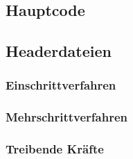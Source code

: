 \documentclass[
    oneside,
    ngerman,
    footinclude=false,
    captions=tableheading,
    DIV=12
]{scrartcl}
\begin{document}
    \aufgabe{}
        \subaufgabe{}
            
        \subaufgabe{}
            
        \subaufgabe{}

        \subaufgabe{}

        \subaufgabe{}
            

    \newpage
    \subsection*{Hauptcode}
        

    \subsection*{Headerdateien}
        \subsubsection*{Einschrittverfahren}
            

        \subsubsection*{Mehrschrittverfahren}
            

        \subsubsection*{Treibende Kräfte}
            
\end{document}
